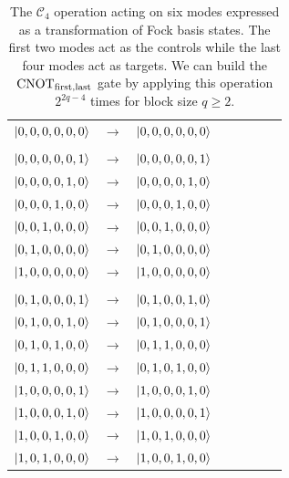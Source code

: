 \documentclass[aps,pra,twocolumn,superscriptaddress,floatfix,10pt]{revtex4}
\begin{document}
\begin {table}[h]
\begin{center}
	\begin{tabular}{l*{6}{c}r} 
		$\ket{0,0,0,0,0,0}$  &  $\rightarrow$ & $\ket{0,0,0,0,0,0}$ \\ \\
		$\ket{0,0,0,0,0,1}$  & $\rightarrow$ & $\ket{0,0,0,0,0,1}$ \\
		$\ket{0,0,0,0,1,0}$ & $\rightarrow$ & $\ket{0,0,0,0,1,0}$ \\
		$\ket{0,0,0,1,0,0}$ & $\rightarrow$ & $\ket{0,0,0,1,0,0} $ \\ 
		$\ket{0,0,1,0,0,0}$ & $\rightarrow$ & $\ket{0,0,1,0,0,0} $\\
		$\ket{0,1,0,0,0,0}$ & $\rightarrow$ & $\ket{0,1,0,0,0,0} $ \\
		$\ket{1,0,0,0,0,0}$ & $\rightarrow$ & $\ket{1,0,0,0,0,0} $ \\ \\
		$\ket{0,1,0,0,0,1}$  & $\rightarrow$ & $\ket{0,1,0,0,1,0}$ \\
		$\ket{0,1,0,0,1,0}$  & $\rightarrow$ & $\ket{0,1,0,0,0,1}$ \\
		$\ket{0,1,0,1,0,0}$  & $\rightarrow$ & $\ket{0,1,1,0,0,0}$ \\
		$\ket{0,1,1,0,0,0}$  & $\rightarrow$ & $\ket{0,1,0,1,0,0}$ \\
		$\ket{1,0,0,0,0,1}$  & $\rightarrow$ & $\ket{1,0,0,0,1,0}$ \\
		$\ket{1,0,0,0,1,0}$  & $\rightarrow$ & $\ket{1,0,0,0,0,1}$ \\
		$\ket{1,0,0,1,0,0}$  & $\rightarrow$ & $\ket{1,0,1,0,0,0}$ \\
		$\ket{1,0,1,0,0,0}$  & $\rightarrow$ & $\ket{1,0,0,1,0,0}$ \\
	\end{tabular}
	\caption{ \label{Two Controls Four Targets} The $\mathcal{C}_4$ operation acting on six modes expressed as a transformation of Fock basis states. The first two modes act as the controls while the last four modes act as targets. We can build the $\mbox{CNOT}_{\rm first,last}$ gate by applying this operation $2^{2 q - 4}$ times for block size $q \ge 2$.}
\end{center}
\end{table}
\end{document}
